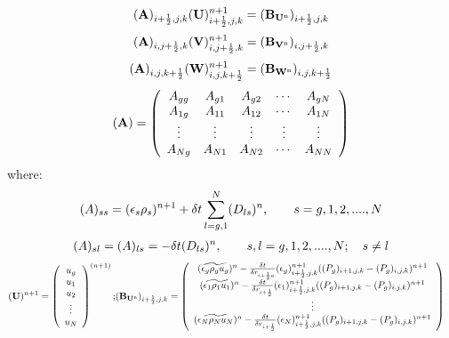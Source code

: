 \begin{eqnarray}
\htmlimage{}
({\bf A})_{i+\frac{1}{2},j,k} ({\bf U})_{i+\frac{1}{2},j,k}^{n+1} = 
({\bf B_{U^{\rm n}}})_{i+\frac{1}{2},j,k}
\nonumber
\end{eqnarray}
%
\begin{eqnarray}
\htmlimage{}
({\bf A})_{i,j+\frac{1}{2},k} ({\bf V})_{i,j+\frac{1}{2},k}^{n+1} = 
({\bf B_{V^{\rm n}}})_{i,j+\frac{1}{2},k}
\nonumber
\end{eqnarray}
%
\begin{eqnarray}
\htmlimage{}
({\bf A})_{i,j,k+\frac{1}{2}} ({\bf W})_{i,j,k+\frac{1}{2}}^{n+1} = 
({\bf B_{W^{\rm n}}})_{i,j,k+\frac{1}{2}}
\nonumber
\end{eqnarray}
%
\begin{eqnarray}
\htmlimage{}
({\bf A}) = \left ( \begin{array}{ccccc}
A_{gg} & A_{g1} & A_{g2} & \cdots & A_{gN} \\
A_{1g} & A_{11} & A_{12} & \cdots & A_{1N} \\
\vdots  & \vdots  &   \vdots  &    \vdots &   \vdots  \\
A_{Ng} & A_{N1} & A_{N2} & \cdots & A_{NN}  \end{array} \right )
\nonumber
\end{eqnarray}
%
where:
%
\begin{eqnarray}
\htmlimage{}
(A)_{ss} = (\epsilon_s \rho_s)^{n+1} + \delta t \sum_{l=g,1}^{N} (D_{ls})^{n},
\qquad  s = g,1,2,....,N
\nonumber
\end{eqnarray}
%
\begin{eqnarray}
\htmlimage{}
(A)_{sl} = (A)_{ls} = - \delta t (D_{ls})^{n},
\qquad  s,l  = g,1,2,....,N; \quad s \not= l
\nonumber
\end{eqnarray}
%
\begin{eqnarray}
\htmlimage{}
({\bf U})^{n+1} =
\left( \begin{array}{c}
u_g \\
u_1 \\
u_2 \\
\vdots \\
u_N \end{array} \right )^{(n+1)}; &
({\bf B_{U^{\rm n}}})_{i+\frac{1}{2},j,k} = 
\left( \begin{array}{c}
(\widetilde {\epsilon_g \rho_g u_g})^n - 
\frac{\delta t}{\delta r_{i+\frac{1}{2}a}} 
(\epsilon_g)_{i+\frac{1}{2},j,k}^{n+1} ((P_g)_{i+1,j,k} - (P_g)_{i,j,k})^{n+1}     \\
(\widetilde {\epsilon_1 \rho_1 u_1})^n - 
\frac{\delta t}{\delta r_{i+\frac{1}{2}}} 
(\epsilon_1)_{i+\frac{1}{2},j,k}^{n+1} ((P_g)_{i+1,j,k} - (P_g)_{i,j,k})^{n+1}     \\
\vdots        \\
(\widetilde {\epsilon_N \rho_N u_N})^n -
\frac{\delta t}{\delta r_{i+\frac{1}{2}}} 
(\epsilon_N)_{i+\frac{1}{2},j,k}^{n+1} ((P_g)_{i+1,j,k} - (P_g)_{i,j,k})^{n+1}
\end{array} \right )
\nonumber
\end{eqnarray}
